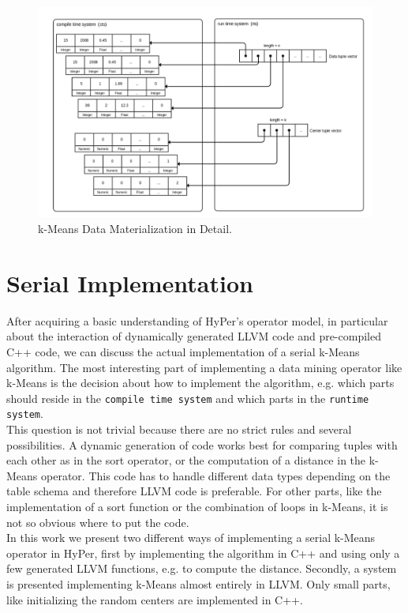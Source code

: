 \begin{figure}[htsb]
  \centering
  \includegraphics[scale=0.25]{figures/mat3}
  \caption[k-Means Data Materialization in Detail]{k-Means Data Materialization in Detail.}
  \label{fig:mat3}
\end{figure}




\section{Serial Implementation}

After acquiring a basic understanding of HyPer’s operator model, in particular about the interaction of dynamically generated LLVM code and pre-compiled C++ code, we can discuss the actual implementation of a serial k-Means algorithm. The most interesting part of implementing a data mining operator like k-Means is the decision about how to implement the algorithm, e.g. which parts should reside in the \texttt{compile time system} and which parts in the \texttt{runtime system}. 
\\
This question is not trivial because there are no strict rules and several possibilities. A dynamic generation of code works best for comparing tuples with each other as in the sort operator, or the computation of a distance in the k-Means operator. This code has to handle different data types depending on the table schema and therefore LLVM code is preferable. For other parts, like the implementation of a sort function or the combination of loops in k-Means, it is not so obvious where to put the code.
\\
In this work we present two different ways of implementing a serial k-Means operator in HyPer, first by implementing the algorithm in C++ and using only a few generated LLVM functions, e.g. to compute the distance. Secondly, a system is presented implementing k-Means almost entirely in LLVM. Only small parts, like initializing the random centers are implemented in C++.



